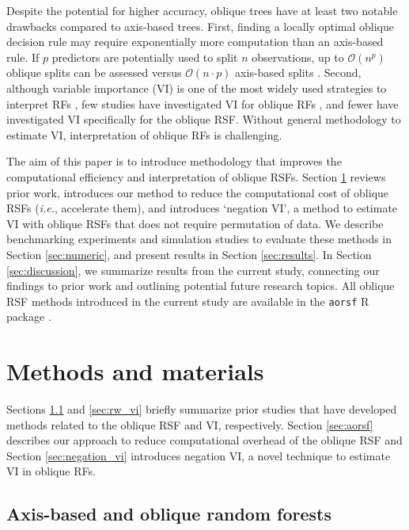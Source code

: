 \documentclass[12pt]{article}\usepackage[]{graphicx}\usepackage[]{xcolor}
\newcommand{\ie}{\textit{i.e.}}
\newcommand{\secref}[1]{Section \ref{#1}}
\begin{document}
Despite the potential for higher accuracy, oblique trees have at least two notable drawbacks compared to axis-based trees. First, finding a locally optimal oblique decision rule may require exponentially more computation than an axis-based rule. If $p$ predictors are potentially used to split $n$ observations, up to $\mathcal{O}(n^p)$ oblique splits can be assessed versus $\mathcal{O}(n \cdot p)$ axis-based splits \citep{heath1993induction, murthy1994system}. Second, although variable importance (VI) is one of the most widely used strategies to interpret RFs \citep{ishwaran2019standard}, few studies have investigated VI for oblique RFs \citep[see][Section~5]{menze2011oblique}, and fewer have investigated VI specifically for the oblique RSF. Without general methodology to estimate VI, interpretation of oblique RFs is challenging.

The aim of this paper is to introduce methodology that improves the computational efficiency and interpretation of oblique RSFs. \secref{sec:methods} reviews prior work, introduces our method to reduce the computational cost of oblique RSFs (\ie, accelerate them), and introduces `negation VI', a method to estimate VI with oblique RSFs that does not require permutation of data. We describe benchmarking experiments and simulation studies to evaluate these methods in \secref{sec:numeric}, and present results in \secref{sec:results}. In \secref{sec:discussion}, we summarize results from the current study, connecting our findings to prior work and outlining potential future research topics. All oblique RSF methods introduced in the current study are available in the \texttt{aorsf} R package \citep{jaeger2022aorsf}.

\section{Methods and materials} \label{sec:methods}

Sections \ref{sec:rw_forests} and \ref{sec:rw_vi} briefly summarize prior studies that have developed methods related to the oblique RSF and VI, respectively. \secref{sec:aorsf} describes our approach to reduce computational overhead of the oblique RSF and \secref{sec:negation_vi} introduces negation VI, a novel technique to estimate VI in oblique RFs.

\subsection{Axis-based and oblique random forests} \label{sec:rw_forests}
\end{document}
